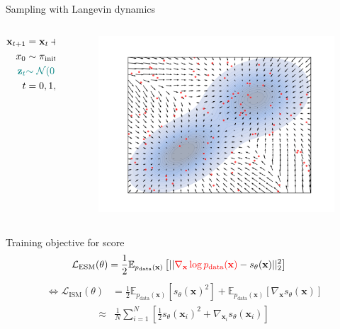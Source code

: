 \documentclass[aspectratio=169,xcolor=dvipsnames]{beamer}
\newcommand{\bx}{\mathbf{x}}
\newcommand{\nbx}{\nabla_{\bx}}
\begin{document}
\begin{frame}{Sampling with Langevin dynamics}
  \begin{columns}
    \begin{column}{0.5\textwidth}
      \begin{align*}
        \bx_{t+1} &= \bx_{t} + \alpha \cdot s_\theta(\bx_t) + \textcolor{teal}{\alpha \epsilon \cdot \mathbf{z}_t} \\
        x_0 &\sim \pi_{\text{init}}\\
        \textcolor{teal}{\textbf{z}_t} &\textcolor{teal}{\sim \mathcal{N}(0, 1)}\\
        t &= 0, 1, \dots T \to \infty
      \end{align*}
    \end{column}
    \begin{column}{0.5\textwidth}
      \centering
      \begin{figure}
        \centering
        \includegraphics[width=\textwidth]{figs/gen/gaussian_mixture_score_init.png}
      \end{figure}
    \end{column}
  \end{columns}
\end{frame}

\begin{frame}{Training objective for score}
  \pause
\begin{align*}
      \mathcal{L}_\text{ESM} (\theta) &= \frac{1}{2}\mathbb{E}_{p_\text{data}(\bx)} \left[ || \textcolor{red}{\nbx \log p_\text{data}(\bx)} - s_\theta(\bx) ||_2^2\right]
  \end{align*}
  \pause
  \begin{align*}
      \iff \mathcal{L}_\text{ISM}(\theta) &= \frac{1}{2}\mathbb{E}_{p_\text{data}(\bx)} \left[ s_\theta(\bx)^2\right] + \mathbb{E}_{p_\text{data}(\bx)}\left[\nbx s_\theta(\bx) \right]
  \end{align*}
  \pause
  \begin{align*}
      \approx & \frac{1}{N} \sum\limits_{i=1}^{N}  \left[\frac{1}{2} s_\theta(\bx_i)^2 + \nabla_{\bx_i} s_\theta(\bx_i)  \right]
  \end{align*}
\end{frame}
\end{document}
